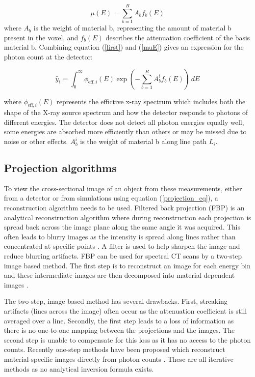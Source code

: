 \documentclass{article}
\begin{document}
\begin{equation}
\label{muE}
\mu(E) = \sum_{b=1}^{B} A_b f_b(E)
\end{equation}
where $A_b$ is the weight of material b, representing the amount of material b present in the voxel, and $f_b(E)$ describes the attenuation coefficient of the basis material b. Combining equation (\ref{first}) and (\ref{muE}) gives an expression for the photon count at the detector:

\begin{equation}
\hat{y}_i = \int_0^{\infty} \phi_{\text{eff},i}(E) \exp\left( - \sum_{b=1}^{B} A_b^i f_b(E) \right) \, dE
\end{equation}

where $\phi_{\text{eff},i}(E)$ represents the effictive x-ray spectrum which includes both the shape of the X-ray source spectrum and how the detector responds to photons of different energies. The detector does not detect all photon energies equally well, some energies are absorbed more efficiently than others or may be missed due to noise or other effects. $A_b^i$ is the weight of material b along line path $L_i$.

\subsection{Projection algorithms}

To view the cross-sectional image of an object from these measurements, either from a detector or from simulations using equation (\ref{projection_eq}), a reconstruction algorithm needs to be used. Filtered back projection (FBP) is an analytical reconstruction algorithm where during reconstruction each projection is spread back across the image plane along the same angle it was acquired. This often leads to blurry images as the intensity is spread along lines rather than concentrated at specific points \citep{zeng2001image}. A filter is used to help sharpen the image and reduce blurring artifacts. FBP can be used for spectral CT scans by a two-step image based method. The first step is to reconstruct an image for each energy bin and these intermediate images are then decomposed into material-dependent images \citep{mory2018comparison}.

The two-step, image based method has several drawbacks. First, streaking artifacts (lines across the image) often occur as the attenuation coefficient is still averaged over a line. Secondly, the first step leads to a loss of information as there is no one-to-one mapping between the projections and the images. The second step is unable to compensate for this loss as it has no access to the photon counts. Recently one-step methods have been proposed which reconstruct material-specific images directly from photon counts \citep{mechlem2018joint}. These are all iterative methods as no analytical inversion formula exists.
\end{document}

